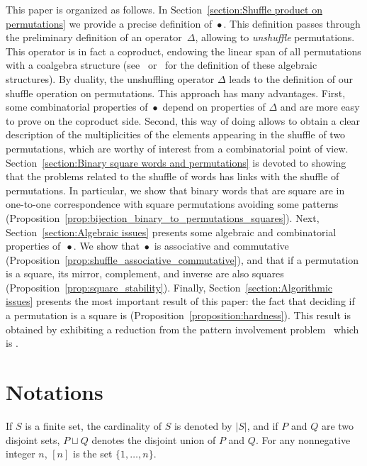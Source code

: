 \documentclass[a4paper]{llncs}
\DeclareMathOperator{\SHUFFLE}{\bullet}
\begin{document}
This paper is organized as follows. In
Section~\ref{section:Shuffle product on permutations} we provide a
precise definition of $\SHUFFLE$. This definition passes through the
preliminary definition of an operator~$\Delta$, allowing to
{\em unshuffle} permutations. This operator is in fact a coproduct,
endowing the linear span of all permutations with a coalgebra structure
(see~\cite{Joni:Rota:1979} or~\cite{Grinberg:Reiner:2014} for the
definition of these algebraic structures). By duality, the unshuffling
operator $\Delta$ leads to the definition of our shuffle operation on
permutations. This approach has many advantages. First, some
combinatorial properties of $\SHUFFLE$ depend on properties of $\Delta$
and are more easy to prove on the coproduct side. Second, this way of
doing allows to obtain a clear description of the multiplicities of the
elements appearing in the shuffle of two permutations, which are worthy
of interest from a combinatorial point of view.
Section~\ref{section:Binary square words and permutations} is devoted to
showing that the problems related to the shuffle of words has links with
the shuffle of permutations. In particular, we show that binary words
that are square are in one-to-one correspondence with square
permutations avoiding some patterns
(Proposition~\ref{prop:bijection_binary_to_permutations_squares}). Next,
Section~\ref{section:Algebraic issues} presents some algebraic and
combinatorial properties of~$\SHUFFLE$. We show that $\SHUFFLE$ is
associative and commutative
(Proposition~\ref{prop:shuffle_associative_commutative}), and that if a
permutation is a square, its mirror, complement, and inverse are also
squares (Proposition~\ref{prop:square_stability}). Finally,
Section~\ref{section:Algorithmic issues} presents the most important result
of this paper: the fact that deciding if a permutation is a square is
\NPC (Proposition~\ref{proposition:hardness}). This result is obtained
by exhibiting a reduction from the pattern involvement
problem~\cite{Bose:Buss:Lubiw:1998} which is \NPC.


\section{Notations}
\label{section:Notations}

If $S$ is a finite set, the cardinality of $S$ is denoted by $|S|$,
and if $P$ and $Q$ are two disjoint sets, $P \sqcup Q$ denotes the
disjoint union of $P$ and $Q$. For any nonnegative integer $n$, $[n]$
is the set $\{1, \dots, n\}$.
\end{document}
